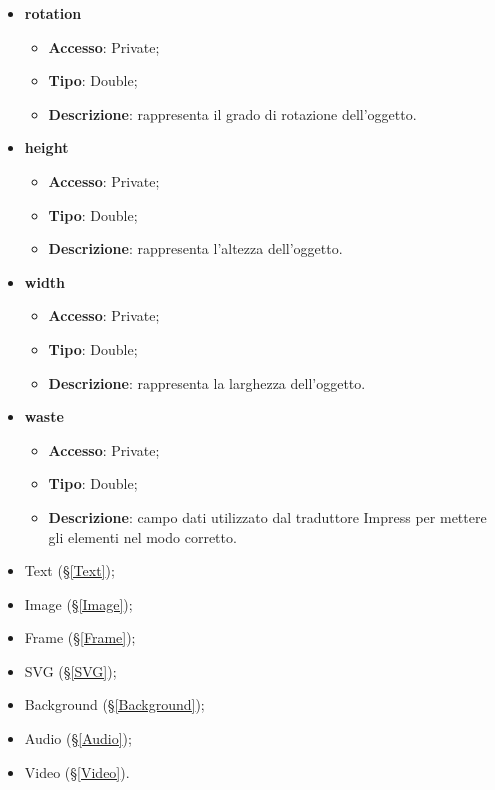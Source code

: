 {\begin{itemize}
\begin{itemize}
			\end{itemize}
			\item \textbf{rotation}
			\begin{itemize}
				\item \textbf{Accesso}: Private;
				\item \textbf{Tipo}: Double;
				\item \textbf{Descrizione}: rappresenta il grado di rotazione dell’oggetto.
			\end{itemize}
			\item \textbf{height}
			\begin{itemize}
				\item \textbf{Accesso}: Private;
				\item \textbf{Tipo}: Double;
				\item \textbf{Descrizione}: rappresenta l’altezza dell’oggetto.
			\end{itemize}
			\item \textbf{width}
			\begin{itemize}
				\item \textbf{Accesso}: Private;
				\item \textbf{Tipo}: Double;
				\item \textbf{Descrizione}: rappresenta la larghezza dell’oggetto.
			\end{itemize}
			\item \textbf{waste}
			\begin{itemize}
				\item \textbf{Accesso}: Private;
				\item \textbf{Tipo}: Double;
				\item \textbf{Descrizione}: campo dati utilizzato dal traduttore Impress per mettere gli elementi nel modo corretto.
			\end{itemize}
		\end{itemize}
		
		\begin{itemize}
			\item Text (\S\ref{Text});
			\item Image (\S\ref{Image});
			\item Frame (\S\ref{Frame});
			\item SVG (\S\ref{SVG});
			\item Background (\S\ref{Background});
			\item Audio (\S\ref{Audio});
			\item Video (\S\ref{Video}).
		\end{itemize}
		
}
